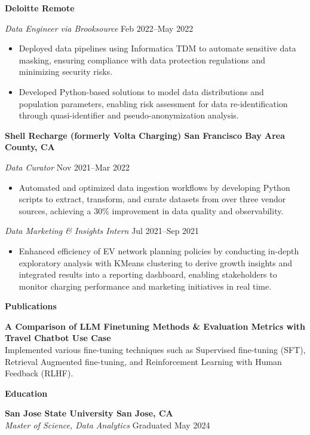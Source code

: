 \documentclass[letterpaper,11pt]{article}
\newcommand{\resumesection}[1]{
  \vspace{8pt}
  \noindent\textbf{\Large #1} \\
  \vspace{2pt}
}
\begin{document}
\textbf{Deloitte \hfill Remote}\par
\textit{Data Engineer via Brooksource} \hfill  Feb 2022--May 2022
\begin{itemize}[leftmargin=0.15in, itemsep=1pt, parsep=0pt]
    \item Deployed data pipelines using Informatica TDM to automate sensitive data masking, ensuring compliance with data protection regulations and minimizing security risks.
    \item Developed Python-based solutions to model data distributions and population parameters, enabling risk assessment for data re-identification through quasi-identifier and pseudo-anonymization analysis.
\end{itemize}

\textbf{Shell Recharge (formerly Volta Charging) \hfill San Francisco Bay Area County, CA}\par
\textit{Data Curator} \hfill Nov 2021--Mar 2022
\begin{itemize}[leftmargin=0.15in, itemsep=1pt, parsep=0pt]
    \item Automated and optimized data ingestion workflows by developing Python scripts to extract, transform, and curate datasets from over three vendor sources, achieving a 30\% improvement in data quality and observability.
\end{itemize}

\textit{Data Marketing \& Insights Intern} \hfill Jul 2021--Sep 2021
\begin{itemize}[leftmargin=0.15in, itemsep=1pt, parsep=0pt]
    \item Enhanced efficiency of EV network planning policies by conducting in-depth exploratory analysis with KMeans clustering to derive growth insights and integrated results into a reporting dashboard, enabling stakeholders to monitor charging performance and marketing initiatives in real time.
\end{itemize}

\resumesection{Publications}

\textbf{A Comparison of LLM Finetuning Methods \& Evaluation Metrics with Travel Chatbot Use Case} \\
Implemented various fine-tuning techniques such as Supervised fine-tuning (SFT), Retrieval Augmented fine-tuning, and Reinforcement Learning with Human Feedback (RLHF).

\resumesection{Education}

\textbf{San Jose State University \hfill San Jose, CA} \\
\textit{Master of Science, Data Analytics} \hfill Graduated May 2024 \\
\end{document}
